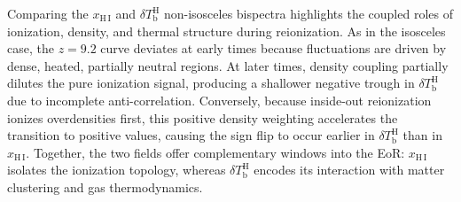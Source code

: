 \documentclass[apj,twocolumn, appendixfloats, twocolappendix, numberedappendix, tighten]{openjournal}
\begin{document}

Comparing the $x_\mathrm{H\,I}$ and $\delta T_\mathrm{b}^\mathrm{H}$ non-isosceles bispectra highlights the coupled roles of ionization, density, and thermal structure during reionization. As in the isosceles case, the $z = 9.2$ curve deviates at early times because fluctuations are driven by dense, heated, partially neutral regions. At later times, density coupling partially dilutes the pure ionization signal, producing a shallower negative trough in $\delta T_\mathrm{b}^\mathrm{H}$ due to incomplete anti-correlation. Conversely, because inside-out reionization ionizes overdensities first, this positive density weighting accelerates the transition to positive values, causing the sign flip to occur earlier in $\delta T_\mathrm{b}^\mathrm{H}$ than in $x_\mathrm{H\,I}$. Together, the two fields offer complementary windows into the EoR: $x_\mathrm{H\,I}$ isolates the ionization topology, whereas $\delta T_\mathrm{b}^\mathrm{H}$ encodes its interaction with matter clustering and gas thermodynamics.
\end{document}
